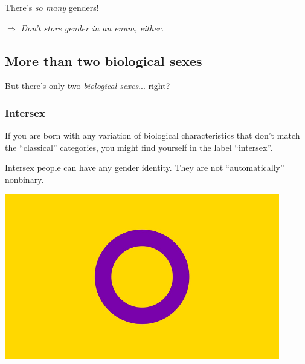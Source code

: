 \documentclass[aspectratio=169,x11names]{beamer}
\begin{document}
\begin{frame}
\begin{center}
\huge
There's \emph{so many} genders!\medskip

\Large
$\Rightarrow$ \emph{Don't store gender in an enum, either.}
\end{center}
\end{frame}

\subsection{More than two biological sexes}

\begin{frame}
\begin{center}
\huge
But there's only two \emph{biological sexes}... right?
\end{center}
\end{frame}

\begin{frame}
\frametitle{Intersex}
\begin{minipage}{0.475\textwidth}
\large
If you are born with any variation of biological characteristics that don't match the ``classical'' categories, you might find yourself in the label ``intersex''. 
\bigskip

Intersex people can have any gender identity. They are not ``automatically'' nonbinary.
\end{minipage}
\hfill
\begin{minipage}{0.45\textwidth}
\begin{center}
\includegraphics[width=0.9\textwidth,keepaspectratio]{images/800px-Intersex-2.png} 
\end{center}
\end{minipage}
\end{frame}
\end{document}
